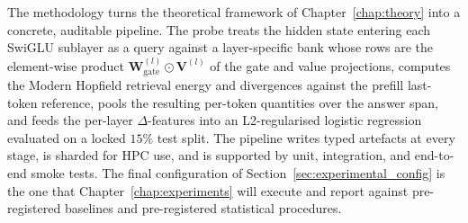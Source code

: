 The methodology turns the theoretical framework of
Chapter~\ref{chap:theory} into a concrete, auditable pipeline. The probe
treats the hidden state entering each SwiGLU sublayer as a query against
a layer-specific bank whose rows are the element-wise product
$\mathbf{W}_{\mathrm{gate}}^{(l)} \odot \mathbf{V}^{(l)}$ of the gate and
value projections, computes the Modern Hopfield retrieval energy and
divergences against the prefill last-token reference, pools the resulting
per-token quantities over the answer span, and feeds the per-layer
$\Delta$-features into an L2-regularised logistic regression evaluated on
a locked $15\%$ test split. The pipeline writes typed artefacts at every
stage, is sharded for HPC use, and is supported by unit, integration, and
end-to-end smoke tests. The final configuration of
Section~\ref{sec:experimental_config} is the one that
Chapter~\ref{chap:experiments} will execute and report against
pre-registered baselines and pre-registered statistical procedures.

